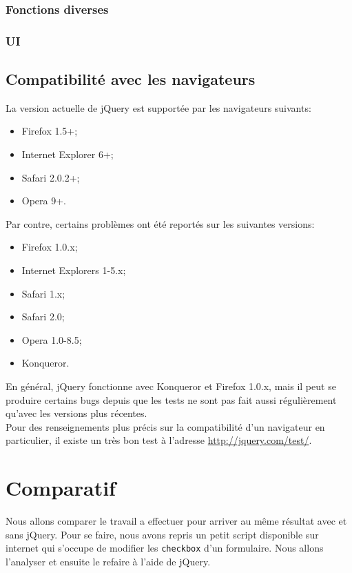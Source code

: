 \documentclass[10pt,a4paper,titlepage]{article}
\begin{document}
\subsubsection{Fonctions diverses}
\subsubsection{UI}

\subsection{Compatibilité avec les navigateurs}
La version actuelle de jQuery est supportée par les navigateurs suivants:

\begin{itemize}
	\item {Firefox 1.5+;}
	\item {Internet Explorer 6+;}
	\item {Safari 2.0.2+;}
	\item {Opera 9+.\\}
\end{itemize}

Par contre, certains problèmes ont été reportés sur les suivantes versions:
\begin{itemize}
	\item {Firefox 1.0.x;}
	\item {Internet Explorers 1-5.x;}
	\item {Safari 1.x;}
	\item {Safari 2.0;}
	\item {Opera 1.0-8.5;}
	\item {Konqueror.\\}
\end{itemize}

En général, jQuery fonctionne avec Konqueror et Firefox 1.0.x, mais il peut se produire certains bugs depuis que les tests ne sont pas fait aussi régulièrement qu'avec les versions plus récentes.\\

Pour des renseignements plus précis sur la compatibilité d'un navigateur en particulier, il existe un très bon test à l'adresse \url{http://jquery.com/test/}.

\newpage
\section{Comparatif}

Nous allons comparer le travail a effectuer pour arriver au même résultat avec et sans jQuery. Pour se faire, nous avons repris un petit script disponible sur internet qui s'occupe de modifier les \texttt{checkbox} d'un formulaire. Nous allons l'analyser et ensuite le refaire à l'aide de jQuery. \\
\end{document}
